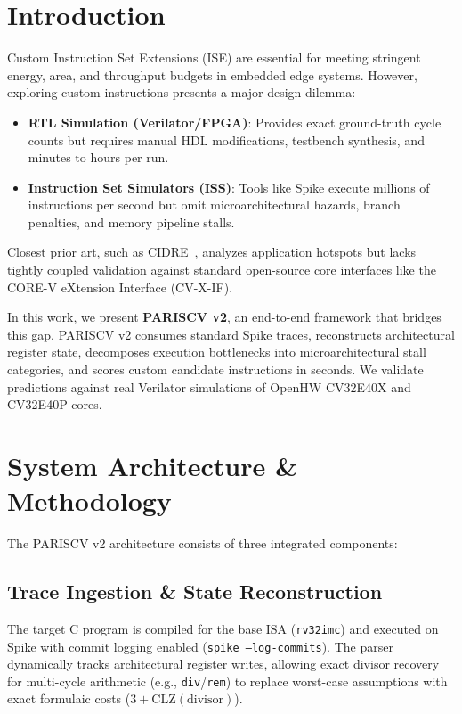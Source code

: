 \documentclass[conference]{IEEEtran}
\begin{document}
\section{Introduction}
Custom Instruction Set Extensions (ISE) are essential for meeting stringent energy, area, and throughput budgets in embedded edge systems. However, exploring custom instructions presents a major design dilemma:
\begin{itemize}
    \item \textbf{RTL Simulation (Verilator/FPGA)}: Provides exact ground-truth cycle counts but requires manual HDL modifications, testbench synthesis, and minutes to hours per run.
    \item \textbf{Instruction Set Simulators (ISS)}: Tools like Spike execute millions of instructions per second but omit microarchitectural hazards, branch penalties, and memory pipeline stalls.
\end{itemize}

Closest prior art, such as CIDRE~\cite{cidre2025}, analyzes application hotspots but lacks tightly coupled validation against standard open-source core interfaces like the CORE-V eXtension Interface (CV-X-IF). 

In this work, we present \textbf{PARISCV v2}, an end-to-end framework that bridges this gap. PARISCV v2 consumes standard Spike traces, reconstructs architectural register state, decomposes execution bottlenecks into microarchitectural stall categories, and scores custom candidate instructions in seconds. We validate predictions against real Verilator simulations of OpenHW CV32E40X and CV32E40P cores.

\section{System Architecture \& Methodology}

The PARISCV v2 architecture consists of three integrated components:

\subsection{Trace Ingestion \& State Reconstruction}
The target C program is compiled for the base ISA (\texttt{rv32imc}) and executed on Spike with commit logging enabled (\texttt{spike --log-commits}). The parser dynamically tracks architectural register writes, allowing exact divisor recovery for multi-cycle arithmetic (e.g., \texttt{div}/\texttt{rem}) to replace worst-case assumptions with exact formulaic costs ($3 + \text{CLZ}(\text{divisor})$).
\end{document}
